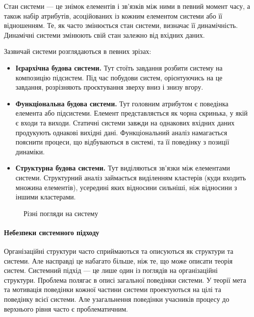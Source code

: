 \documentclass{memoir}
\begin{document}
Стан системи — це знімок елементів і зв’язків між ними в певний момент часу, а також набір атрибутів, асоційованих із кожним елементом системи або її відношенням. Те, як часто змінюється стан системи, визначає її динамічність. Динамічні системи змінюють свій стан залежно від вхідних даних.

Зазвичай системи розглядаються в певних зрізах:

\begin{itemize}
    \item \textbf{Ієрархічна будова системи.} Тут стоїть завдання розбити систему на композицію підсистем. Під час побудови систем, орієнтуючись на це завдання, розрізняють проєктування зверху вниз і знизу вгору.
    \item \textbf{Функціональна будова системи.} Тут головним атрибутом є поведінка елемента або підсистеми. Елемент представляється як чорна скринька, у якій є входи та виходи. Статичні системи завжди на однакових вхідних даних продукують однакові вихідні дані. Функціональний аналіз намагається пояснити процеси, що відбуваються в системі, та її поведінку з позиції динаміки.
    \item \textbf{Структурна будова системи.} Тут виділяються зв’язки між елементами системи. Структурний аналіз займається виділенням кластерів (куди входить множина елементів), усередині яких відносини сильніші, ніж відносини з іншими кластерами.
\end{itemize}

\begin{figure}[h]
    \centering
    \caption{Різні погляди на систему}
    \label{fig:system_views}
\end{figure}

\paragraph{Небезпеки системного підходу}

Організаційні структури часто сприймаються та описуються як структури та системи. Але насправді це набагато більше, ніж те, що може описати теорія систем. Системний підхід — це лише один із поглядів на організаційні структури. Проблема полягає в описі загальної поведінки системи. У теорії мета та мотивація поведінки кожної частини системи проектуються на цілі та поведінку всієї системи. Але узагальнення поведінки учасників процесу до верхнього рівня часто є проблематичним.
\end{document}
